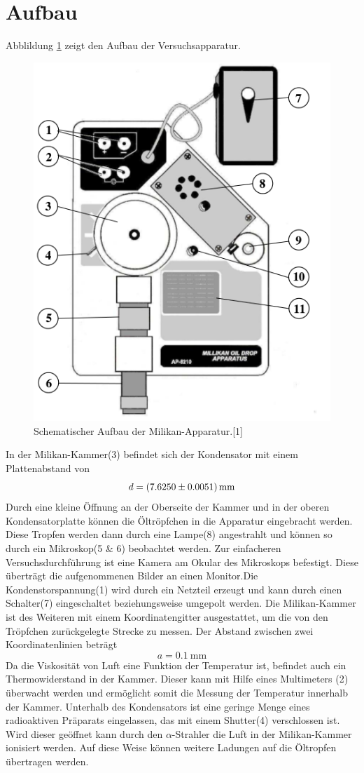 \documentclass[11pt,ngerman,a4paper]{article}
\begin{document}
\section{Aufbau}
Abblildung \ref{aufbau} zeigt den Aufbau der Versuchsapparatur.

\begin{figure}[htp]
\centering
\includegraphics[scale=0.50]{abb2.png}
\caption{Schematischer Aufbau der Milikan-Apparatur.[1]}
\label{aufbau}
\end{figure}

\noindent
 In der Milikan-Kammer(3) befindet sich der Kondensator mit einem Plattenabstand von
\[
d = \SI{7.6250+-0.0051}{\milli\meter}
\]
Durch eine kleine Öffnung an der Oberseite der Kammer und in der oberen Kondensatorplatte können die Öltröpfchen in die Apparatur eingebracht werden. Diese Tropfen werden dann durch eine Lampe(8) angestrahlt und können so durch ein Mikroskop(5 \& 6) beobachtet werden. Zur einfacheren Versuchsdurchführung ist eine Kamera am Okular des Mikroskops befestigt. Diese überträgt die aufgenommenen Bilder an einen Monitor.Die Kondenstorspannung(1) wird durch ein Netzteil erzeugt und kann durch einen Schalter(7) eingeschaltet beziehungsweise umgepolt werden. 
Die Milikan-Kammer ist des Weiteren mit einem Koordinatengitter ausgestattet, um die von den Tröpfchen zurückgelegte Strecke zu messen. Der Abstand zwischen zwei Koordinatenlinien beträgt
\[
a = \SI{0.1}{\milli\meter}
\]
Da die Viskosität von Luft eine Funktion der Temperatur ist, befindet auch ein Thermowiderstand in der Kammer. Dieser kann mit Hilfe eines Multimeters (2) überwacht werden und ermöglicht somit die Messung der Temperatur innerhalb der Kammer. Unterhalb des Kondensators ist eine geringe Menge eines radioaktiven Präparats eingelassen, das mit einem Shutter(4) verschlossen ist. Wird dieser geöffnet kann durch den $\alpha$-Strahler die Luft in der Milikan-Kammer ionisiert werden. Auf diese Weise können weitere Ladungen auf die Öltropfen übertragen werden.
\end{document}
